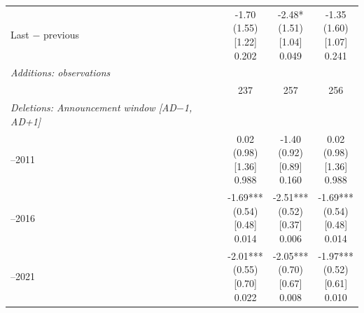 \begin{threeparttable}
\begin{tabular}{@{}lccc}
\addlinespace[0.25ex]
\addlinespace[0.25ex]
Last $-$ previous & \makecell{-1.70\\(1.55)\\{}[1.22]\\{0.202}} & \makecell{-2.48*\\(1.51)\\{}[1.04]\\{0.049}} & \makecell{-1.35\\(1.60)\\{}[1.07]\\{0.241}} \\
\addlinespace[0.25ex]
\midrule
\emph{Additions: observations} \\
\addlinespace[0.25ex]
\addlinespace[1ex]
 & 237 & 257 & 256 \\
\addlinespace[0.25ex]
\midrule
\emph{Deletions: Announcement window [AD$-$1, AD+1]} \\
\addlinespace[0.25ex]
\addlinespace[1ex]
2007–2011 & \makecell{0.02\\(0.98)\\{}[1.36]\\{0.988}} & \makecell{-1.40\\(0.92)\\{}[0.89]\\{0.160}} & \makecell{0.02\\(0.98)\\{}[1.36]\\{0.988}} \\
\addlinespace[0.25ex]
\addlinespace[0.25ex]
2012–2016 & \makecell{-1.69***\\(0.54)\\{}[0.48]\\{0.014}} & \makecell{-2.51***\\(0.52)\\{}[0.37]\\{0.006}} & \makecell{-1.69***\\(0.54)\\{}[0.48]\\{0.014}} \\
\addlinespace[0.25ex]
\addlinespace[0.25ex]
2017–2021 & \makecell{-2.01***\\(0.55)\\{}[0.70]\\{0.022}} & \makecell{-2.05***\\(0.70)\\{}[0.67]\\{0.008}} & \makecell{-1.97***\\(0.52)\\{}[0.61]\\{0.010}} \\

\end{tabular}
\end{threeparttable}
